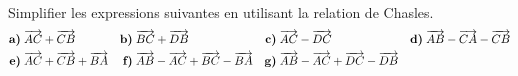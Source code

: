 \documentclass[11pt]{article}
\begin{document}
\begin{exo}
  Simplifier les expressions suivantes en utilisant la relation de Chasles.
  \begin{align*}
    \textbf{a)}\;& \overrightarrow{AC}+\overrightarrow{CB} &
    \textbf{b)}\;& \overrightarrow{BC}+\overrightarrow{DB} &
    \textbf{c)}\;& \overrightarrow{AC}-\overrightarrow{DC} &
    \textbf{d)}\;& \overrightarrow{AB}-\overrightarrow{CA}-\overrightarrow{CB} \\
    \textbf{e)}\;& \overrightarrow{AC}+\overrightarrow{CB}+\overrightarrow{BA} &
    \textbf{f)}\;& \overrightarrow{AB}-\overrightarrow{AC}+\overrightarrow{BC}-\overrightarrow{BA} &
    \textbf{g)}\;& \overrightarrow{AB}-\overrightarrow{AC}+\overrightarrow{DC}-\overrightarrow{DB} &
    &
  \end{align*}
\end{exo}
\end{document}
